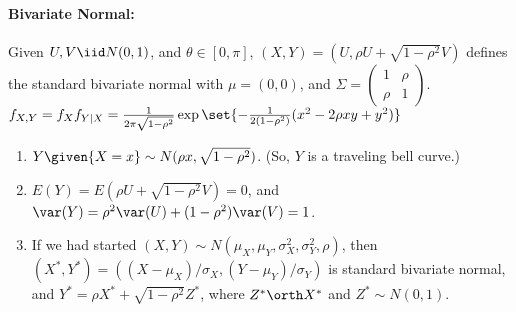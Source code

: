 \documentclass[10pt]{article}
\begin{document}
\begin{multicols}{2}
\paragraph{Bivariate Normal:} Given $U,V \iid N(0,1)$, and $\theta \in [0,\pi]$, $(X,Y) = (U,\rho U + \sqrt{1-\rho^2}V)$ defines the standard bivariate normal with $\mu = (0,0)$, and $\Sigma = \begin{pmatrix} 1 & \rho \\ \rho & 1 \end{pmatrix}$. $f_{X,Y} = f_{X} f_{Y|X} = \frac{1}{2\pi\sqrt{1-\rho^2}} \exp\set{-\frac{1}{2(1-\rho^2)}(x^2 - 2 \rho xy + y^2)}$
\begin{enumerate}
\item $Y \given{X = x} \sim N(\rho x, \sqrt{1-\rho^2})$. (So, $Y$ is a traveling bell curve.)
\item $E(Y) = E(\rho U + \sqrt{1-\rho^2}V) = 0$, and $\var(Y) = \rho^2\var(U) + (1-\rho^2)\var(V) = 1$. 
\item If we had started $(X,Y) \sim N\left(\mu_{X}, \mu_{Y}, \sigma_{X}^{2},  \sigma_{Y}^2,  \rho\right)$, then $(X^{*},Y^{*}) = ((X-\mu_X)/\sigma_{X}, (Y-\mu_{Y})/\sigma_{Y})$ is standard bivariate normal, and $Y^{*} = \rho X^{*} + \sqrt{1-\rho^2} Z^{*}$, where $Z^{*} \orth X^{*}$ and $Z^{*} \sim N(0,1)$. 
\end{enumerate}
\renewcommand{\P}{\ensuremath{\mathbb{P}}}

\end{multicols}
\end{document}
